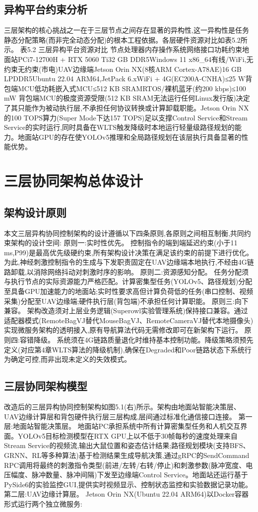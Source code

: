 \subsection{异构平台约束分析}
三层架构的核心挑战之一在于三层节点之间存在显著的异构性,这一异构性是任务静态分配策略(而非完全动态分配)的根本工程依据。各层硬件资源对比如表5.2所示。
表5.2 三层异构平台资源对比
节点处理器内存操作系统网络接口功耗约束地面站PCi7-12700H + RTX 5060 Ti32 GB DDR5Windows 11 x86_64有线/WiFi,无约束无约束(市电)UAV边缘端Jetson Orin NX(8核ARM Cortex-A78AE)16 GB LPDDR5Ubuntu 22.04 ARM64,JetPack 6.xWiFi + 4G(EC200A-CNHA)≤25 W背包端MCU低功耗嵌入式MCU≤512 KB SRAMRTOS/裸机蓝牙(约200 kbps)≤100 mW
背包端MCU的极度资源受限(512 KB SRAM无法运行任何Linux发行版)决定了其只能作为被动执行层,不承担任何协议转换或计算卸载职能。Jetson Orin NX的100 TOPS算力(Super Mode下达157 TOPS)足以支撑Control Service和Stream Service的实时运行,同时具备在WLTS触发降级时本地运行轻量级路径规划的能力。地面站GPU的存在使YOLOv5推理和全局路径规划在该层执行具备显著的性能优势。


\section{三层协同架构总体设计}
\subsection{架构设计原则}
本文三层异构协同控制架构的设计遵循以下四条原则,各原则之间相互制衡,共同约束架构的设计空间:
原则一:实时性优先。 控制指令的端到端延迟约束(小于11 ms,P99)是最高优先级硬约束,所有架构设计决策在满足该约束的前提下进行优化。为此,神经刺激控制指令的生成与下发职责固定在UAV边缘端本地执行,不经由4G链路卸载,以消除网络抖动对刺激时序的影响。
原则二:资源感知分配。 任务分配须与执行节点的实际资源能力严格匹配。计算密集型任务(YOLOv5、路径规划)分配至具备GPU加速能力的地面站;实时性要求高但计算负荷低的任务(串口控制、视频采集)分配至UAV边缘端;硬件执行层(背包端)不承担任何计算职能。
原则三:向下兼容。 架构改造须对上层业务逻辑(Superowl实验管理系统)保持接口兼容。通过适配器模式(RemoteBagVJ替代MouseBagVJ、RemoteCameraVJ替代本地摄像头)实现微服务架构的透明接入,原有导航算法代码无需修改即可在新架构下运行。
原则四:容错降级。 系统须在4G链路质量退化时维持基本控制功能。降级策略须预先定义(对应第4章WLTS算法的降级机制),确保在Degraded和Poor链路状态下系统行为确定可控,而非出现未定义的失效模式。
\subsection{三层协同架构模型}
改造后的三层异构协同控制架构如图5.1(右)所示。架构由地面站智能决策层、UAV边缘计算层和背包硬件执行层三层构成,层间通过标准化通信接口连接。
第一层:地面站智能决策层。
地面站PC承担系统中所有计算密集型任务和人机交互界面。YOLOv5目标检测模型在RTX GPU上以不低于30帧每秒的速度处理来自Stream Service的视频流,输出大鼠位置和姿态估计结果;路径规划模块(支持BFS、GRNN、RL等多种算法)基于检测结果生成导航决策,通过gRPC的SendCommand RPC调用将最终的刺激指令类型(前进/左转/右转/停止)和刺激参数(脉冲宽度、电压幅度、脉冲数量、脉冲间隔)下发至边缘端Control Service。地面站还运行基于PySide6的实验监控GUI,提供实时视频显示、控制状态监控和实验数据记录功能。
第二层:UAV边缘计算层。
Jetson Orin NX(Ubuntu 22.04 ARM64)以Docker容器形式运行两个独立微服务:

